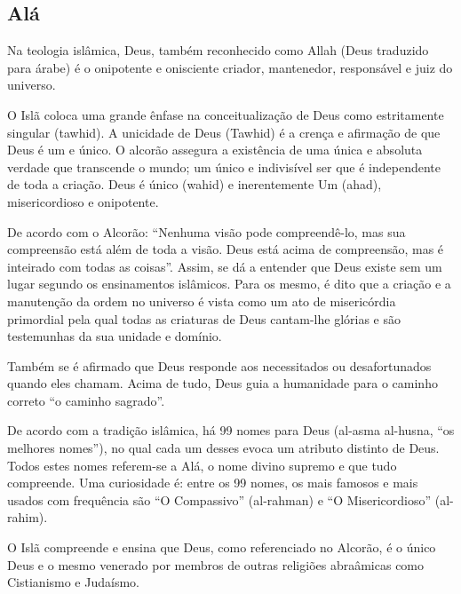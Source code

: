 \documentclass[12pt]{article}
\begin{document}
\subsection{Alá}
Na teologia islâmica, Deus, também reconhecido como Allah (Deus traduzido para árabe) é o onipotente e onisciente criador, mantenedor, responsável e juiz do universo. 
\par O Islã coloca uma grande ênfase na conceitualização de Deus como estritamente singular (tawhid). A unicidade de Deus (Tawhid) é a crença e afirmação de que Deus é um e único. O alcorão assegura a existência de uma única e absoluta verdade que transcende o mundo; um único e indivisível ser que é independente de toda a criação. Deus é único (wahid) e inerentemente Um (ahad), misericordioso e onipotente.
	\par De acordo com o Alcorão: “Nenhuma visão pode compreendê-lo, mas sua compreensão está além de toda a visão. Deus está acima de compreensão, mas é inteirado com todas as coisas”. Assim, se dá a entender que Deus existe sem um lugar segundo os ensinamentos islâmicos. Para os mesmo, é dito que a criação e a manutenção da ordem no universo é vista como um ato de misericórdia primordial pela qual todas as criaturas de Deus cantam-lhe glórias e são testemunhas da sua unidade e domínio.
	\par Também se é afirmado que Deus responde aos necessitados ou desafortunados quando eles chamam. Acima de tudo, Deus guia a humanidade para o caminho correto “o caminho sagrado”.
	\par De acordo com a tradição islâmica, há 99 nomes para Deus (al-asma al-husna, “os melhores nomes”), no qual cada um desses evoca um atributo distinto de Deus. Todos estes nomes referem-se a Alá, o nome divino supremo e que tudo compreende. Uma curiosidade é: entre os 99 nomes, os mais famosos e mais usados com frequência são “O Compassivo” (al-rahman) e “O Misericordioso” (al-rahim).
	\par O Islã compreende e ensina que Deus, como referenciado no Alcorão, é o único Deus e o mesmo venerado por membros de outras religiões abraâmicas como Cistianismo e Judaísmo.
\end{document}
